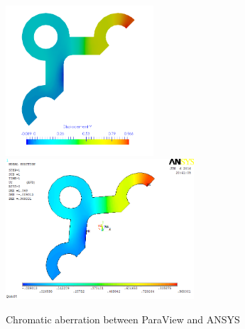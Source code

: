 \begin{figure}
	\begin{center}
		\includegraphics[width=5.5cm,clip]{ParaViewColor.png} 	
		\includegraphics[width=7cm,clip]{ANSYSColor.png} 	
		\caption{Chromatic aberration between ParaView and ANSYS} \label{fig: Color}
	\end{center}
\end{figure}
\clearpage 

